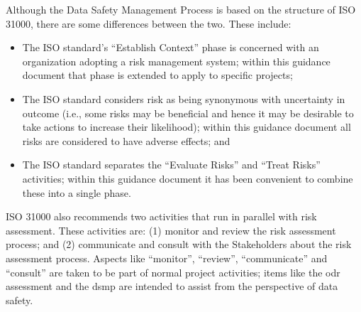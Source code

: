 Although the Data Safety Management Process is based on the structure of ISO 31000, there are some differences between the two. These include:
\begin{itemize}
	\item The ISO standard's ``Establish Context'' phase is concerned with an organization adopting a risk management system; within this guidance document that phase is extended to apply to specific projects;
	\item The ISO standard considers risk as being synonymous with uncertainty in outcome (i.e., some risks may be beneficial and hence it may be desirable to take actions to increase their likelihood); within this guidance document all risks are considered to have adverse effects; and
	\item The ISO standard separates the ``Evaluate Risks'' and ``Treat Risks'' activities; within this guidance document it has been convenient to combine these into a single phase.
\end{itemize}

ISO 31000 also recommends two activities that run in parallel with risk assessment. These activities are: (1) monitor and review the risk assessment process; and (2) communicate and consult with the Stakeholders about the risk assessment process. Aspects like ``monitor'', ``review'', ``communicate'' and ``consult'' are taken to be part of normal project activities; items like the \gls{odr} assessment and the \gls{dsmp} are intended to assist from the perspective of data safety.

\cbstart
